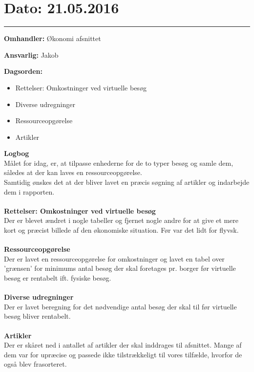\section{Dato: 21.05.2016}
\hrule

\textbf{Omhandler:} Økonomi afsnittet

\textbf{Ansvarlig:} Jakob

\textbf{Dagsorden:}
\begin{itemize}
	\item Rettelser: Omkostninger ved virtuelle besøg
	\item Diverse udregninger
	\item Ressourceopgørelse
	\item Artikler
\end{itemize}

\textbf{Logbog}
\\
Målet for idag, er, at tilpasse enhederne for de to typer besøg og samle dem, således at der kan laves en ressourceopgørelse.\\
Samtidig ønskes det at der bliver lavet en præcis søgning af artikler og indarbejde dem i rapporten. 
\\ \\

\textbf{Rettelser: Omkostninger ved virtuelle besøg}
\\
Der er blevet ændret i nogle tabeller og fjernet nogle andre for at give et mere kort og præcist billede af den økonomiske situation. Før var det lidt for flyvsk. 
\\ \\

\textbf{Ressourceopgørelse}
\\
Der er lavet en ressourceopgørelse for omkostninger og lavet en tabel over 'grænsen' for minimums antal besøg der skal foretages pr. borger før virtuelle besøg er rentabelt ift. fysiske besøg.
\\ \\

\textbf{Diverse udregninger}
\\
Der er lavet beregning for det nødvendige antal besøg der skal til før virtuelle besøg bliver rentabelt.
\\ \\



\textbf{Artikler}
\\
Der er skåret ned i antallet af artikler der skal inddrages til afsnittet. Mange af dem var for upræcise og passede ikke tilstrækkeligt til vores tilfælde, hvorfor de også blev frasorteret.
